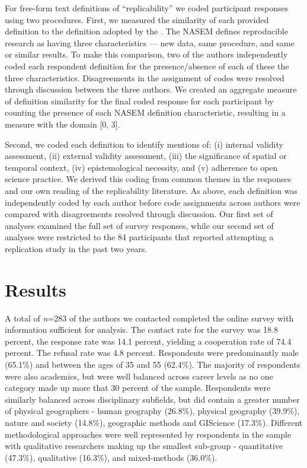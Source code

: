 \documentclass[]{interact}
\theoremstyle{plain}%
\theoremstyle{definition}
\theoremstyle{remark}
\begin{document}
For free-form text definitions of ``replicability'' we coded participant responses using two procedures. 
First, we measured the similarity of each provided definition to the definition adopted by the \citet{NASEM2019}. 
The NASEM defines reproducible research as having three characteristics --- new data, same procedure, and same or similar results.
To make this comparison, two of the authors independently coded each respondent definition for the presence/absence of each of these the three characteristics.
Disagreements in the assignment of codes were resolved through discussion between the three authors.
We created an aggregate measure of definition similarity for the final coded response for each participant by counting the presence of each NASEM definition characteristic, resulting in a measure with the domain [0, 3].

Second, we coded each definition to identify mentions of: (i) internal validity assessment, (ii) external validity assessment, (iii) the significance of spatial or temporal context, (iv) epistemological necessity, and (v) adherence to open science practice.
We derived this coding from common themes in the responses and our own reading of the replicability literature.
As above, each definition was independently coded by each author before code assignments across authors were compared with disagreements resolved through discussion.
Our first set of analyses examined the full set of survey responses, while our second set of analyses were restricted to the 84 participants that reported attempting a replication study in the past two years.

\section*{Results}
A total of \textit{n}=283 of the authors we contacted completed the online survey with information sufficient for analysis. 
The contact rate for the survey was 18.8 percent, the response rate was 14.1 percent, yielding a cooperation rate of 74.4 percent. 
The refusal rate was 4.8 percent.
Respondents were predominantly male (65.1\%) and between the ages of 35 and 55 (62.4\%). 
The majority of respondents were also academics, but were well balanced across career levels as no one category made up more that 30 percent of the sample.
Respondents were similarly balanced across disciplinary subfields, but did contain a greater number of physical geographers  - human geography (26.8\%), physical geography (39.9\%), nature and society (14.8\%), geographic methods and GIScience (17.3\%). 
Different methodological approaches were well represented by respondents in the sample with qualitative researchers making up the smallest sub-group  - quantitative (47.3\%), qualitative (16.3\%), and mixed-methods (36.0\%).
\end{document}
